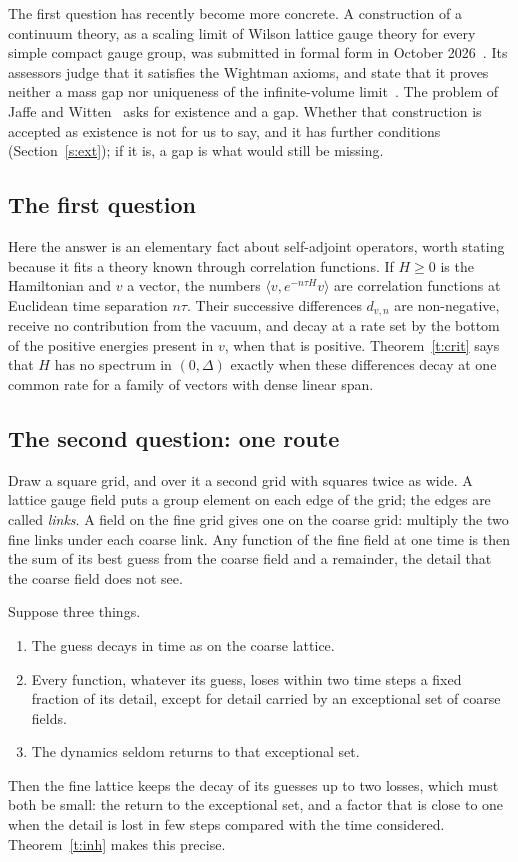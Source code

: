 The first question has recently become more concrete. A construction of a continuum theory, as a scaling
limit of Wilson lattice gauge theory for every simple compact gauge group, was submitted in formal form in
October 2026~\cite{OAI}. Its assessors judge that it satisfies the Wightman axioms, and state that it proves
neither a mass gap nor uniqueness of the infinite-volume limit~\cite[p.~1]{YMG}. The problem of Jaffe and
Witten~\cite[\S4]{JW} asks for existence and a gap. Whether that construction is accepted as existence is not
for us to say, and it has further conditions (Section~\ref{s:ext}); if it is, a gap is what would still be
missing.

\subsection{The first question}
Here the answer is an elementary fact about self-adjoint operators, worth stating because it fits a theory
known through correlation functions. If $H\ge0$ is the Hamiltonian and $v$ a vector, the numbers
$\langle v,e^{-n\tau H}v\rangle$ are correlation functions at Euclidean time separation $n\tau$. Their
successive differences $d_{v,n}$ are non-negative, receive no contribution from the vacuum, and decay at a
rate set by the bottom of the positive energies present in $v$, when that is positive. Theorem~\ref{t:crit} says that $H$ has no spectrum in
$(0,\Delta)$ exactly when these differences decay at one common rate for a family of vectors with dense
linear span.

\subsection{The second question: one route}
Draw a square grid, and over it a second grid with squares twice as wide. A lattice gauge field puts a group
element on each edge of the grid; the edges are called \emph{links}. A field on the fine grid gives one on
the coarse grid: multiply the two fine links under each coarse link. Any function of the fine field at one
time is then the sum of its best guess from the coarse field and a remainder, the detail that the coarse
field does not see.

Suppose three things.
\begin{enumerate}
\item[(a)] The guess decays in time as on the coarse lattice.
\item[(b)] Every function, whatever its guess, loses within two time steps a fixed fraction of its detail,
except for detail carried by an exceptional set of coarse fields.
\item[(c)] The dynamics seldom returns to that exceptional set.
\end{enumerate}
Then the fine lattice keeps the decay of its guesses up to two losses, which must both be small: the return to
the exceptional set, and a factor that is close to one when the detail is lost in few steps compared with
the time considered. Theorem~\ref{t:inh} makes this precise.


